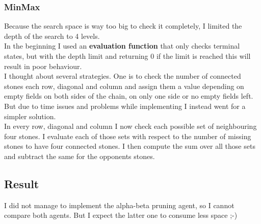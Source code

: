 \documentclass[paper=a4, fontsize=11pt]{scrartcl} %
\numberwithin{equation}{section} %
\numberwithin{figure}{section} %
\numberwithin{table}{section} %
\begin{document}
\subsubsection{MinMax}
Because the search space is way too big to check it completely, I limited the depth of the search to 4 levels.\\
In the beginning I used an \textbf{evaluation function} that only checks terminal states, but with the depth limit and returning 0 if the limit is reached this will result in poor behaviour.\\
I thought about several strategies. One is to check the number of connected stones each row, diagonal and column and assign them a value depending on empty fields on both sides of the chain, on only one side or no empty fields left. But due to time issues and problems while implementing I instead went for a simpler solution.\\
In every row, diagonal and column I now check each possible set of neighbouring four stones. I evaluate each of those sets with respect to the number of missing stones to have four connected stones. I then compute the sum over all those sets and subtract the same for the opponents stones.

\subsection{Result}
I did not manage to implement the alpha-beta pruning agent, so I cannot compare both agents. But I expect the latter one to consume less space ;-)
\end{document}
